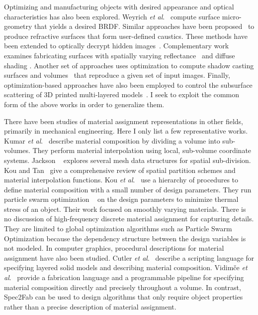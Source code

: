 Optimizing and manufacturing objects with desired appearance and optical characteristics has also been explored. Weyrich \textit{et al}.~ compute surface micro-geometry that yields a desired BRDF. Similar approaches have been proposed~\cite{Finckh:2010,Marios:2011} to produce refractive surfaces that form user-defined caustics. These methods have been extended to optically decrypt hidden images~\cite{Papas:2012}. Complementary work examines fabricating surfaces with spatially varying reflectance~\cite{Matusik:2009:PSR,Malzbender:2012:PRF} and diffuse shading \cite{Alexa:2010:RAI}. Another set of approaches uses optimization to compute shadow casting surfaces and volumes~\cite{Mitra:2009:SA,Bermano:2012,Baran:2012:MLA} that reproduce a given set of input images. Finally, optimization-based approaches have also been employed to control the subsurface scattering of 3D printed multi-layered models~\cite{Dong:2010:FSS,Hasan:2010:PRO}. I seek to exploit the common form of the above works in order to generalize them. 

There have been studies of material assignment representations in other fields, primarily in mechanical engineering. 
Here I only list a few representative works. Kumar \textit{et al}.~ describe material composition by dividing a volume into sub-volumes. They perform material interpolation  using local, sub-volume coordinate systems. 
Jackson ~ explores several mesh data structures for spatial sub-division. Kou and Tan~ give a comprehensive review of spatial partition schemes and material interpolation functions. Kou \textit{et al}.~ use a hierarchy of procedures to define material composition with a small number of design parameters. They run particle swarm optimization ~\cite{kennedy1995} on the design parameters to minimize thermal stress of an object. Their work focused on smoothly varying materials. There is no discussion of high-frequency discrete material assignment for capturing details. They are limited to global optimization algorithms such as Particle Swarm Optimization because the dependency structure between the design variables is not modeled.
In computer graphics, procedural descriptions for material assignment have also been studied.
Cutler \textit{et al}.~ describe a scripting language for specifying layered solid models and describing material composition. Vidim\v{c}e \textit{et al}.~ provide a fabrication language and a programmable pipeline for specifying material composition directly and precisely throughout a volume. In contrast, Spec2Fab can be used to design algorithms that only require object properties rather than a precise description of material assignment.

